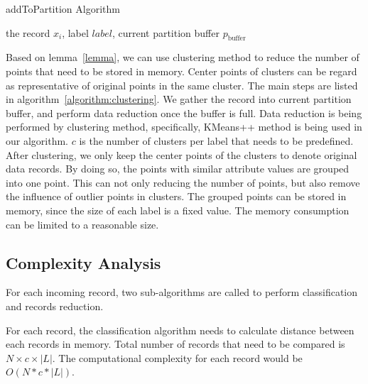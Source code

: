 \documentclass[runningheads]{llncs}
\begin{document}
	\begin{algorithm}
		\caption{addToPartition Algorithm} \label{algorithm:clustering}
		\begin{algorithmic}
			\REQUIRE the record $x_i$, label $label$, current partition buffer $p_\text{buffer}$
			\ELSE 
			\ENDFOR
			\ENDIF
		\end{algorithmic}
	\end{algorithm}
	
	Based on lemma~\ref{lemma}, we can use clustering method to reduce the number of points that need to be stored in memory. Center points of clusters can be regard as representative of original points in the same cluster. The main steps are listed in algorithm~\ref{algorithm:clustering}. We gather the record into current partition buffer, and perform data reduction once the buffer is full. Data reduction is being performed by clustering method, specifically, KMeans++\cite{Arthur} method is being used in our algorithm. $c$ is the number of clusters per label that needs to be predefined. After clustering, we only keep the center points of the clusters to denote original data records. By doing so, the points with similar attribute values are grouped into one point. This can not only reducing the number of points, but also remove the influence of outlier points in clusters. The grouped points can be stored in memory, since the size of each label is a fixed value. The memory consumption can be limited to a reasonable size. 
	
	\subsection{Complexity Analysis}
	
	For each incoming record, two sub-algorithms are called to perform classification and records reduction.
	
	For each record, the classification algorithm needs to calculate distance between each records in memory. Total number of records that need to be compared is $N \times c \times |L|$. The computational complexity for each record would be $O(N*c*|L|)$.
	
\end{document}
